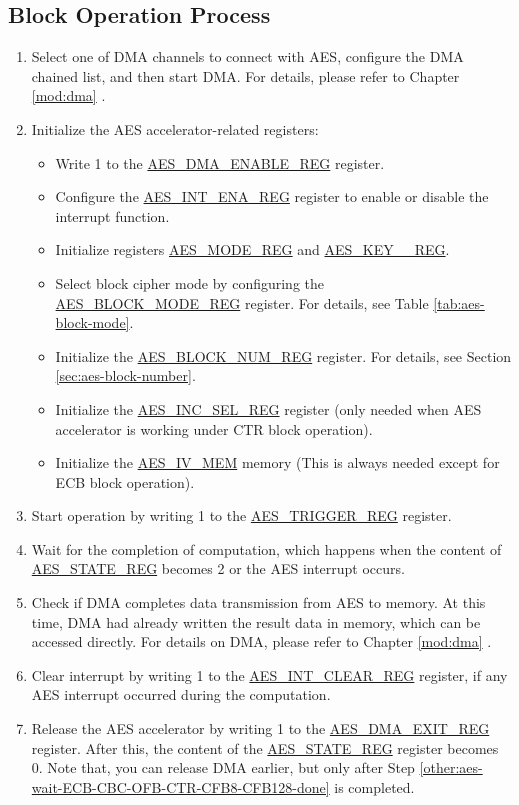 \documentclass[main\_\_EN.tex]{subfiles}
\begin{document}
\subsection{Block Operation Process}
\begin{enumerate}
    \item Select one of DMA channels to connect with AES, configure the DMA chained list, and then start DMA. For details, please refer to Chapter \ref{mod:dma} \textit{}.
    \item Initialize the AES accelerator-related registers:
    \begin{itemize}
        \item Write 1 to the \hyperref[regdesc:AESDMAENABLEREG]{AES\_DMA\_ENABLE\_REG} register.
        \item Configure the \hyperref[regdesc:AESINTENAREG]{AES\_INT\_ENA\_REG} register to enable or disable the interrupt function.
        \item Initialize registers \hyperref[regdesc:AESMODEREG]{AES\_MODE\_REG} and \hyperref[regdesc:AESKEYnREG]{AES\_KEY\_\_REG}.
        \item Select block cipher mode by configuring the \hyperref[regdesc:AESBLOCKMODEREG]{AES\_BLOCK\_MODE\_REG} register. For details, see Table \ref{tab:aes-block-mode}.
        \item Initialize the \hyperref[regdesc:AESBLOCKNUMREG]{AES\_BLOCK\_NUM\_REG} register. For details, see Section \ref{sec:aes-block-number}.
        \item Initialize the \hyperref[regdesc:AESINCSELREG]{AES\_INC\_SEL\_REG} register (only needed when AES accelerator is working under CTR block operation).
        \item Initialize the \hyperref[memdesc:AESIVMEM]{AES\_IV\_MEM} memory (This is always needed except for ECB block operation).
    \end{itemize}
    \item Start operation by writing 1 to the \hyperref[regdesc:AESTRIGGERREG]{AES\_TRIGGER\_REG} register.
    \item \label{other:aes-wait-ECB-CBC-OFB-CTR-CFB8-CFB128-done}
            Wait for the completion of computation, which happens when the content of \hyperref[regdesc:AESSTATEREG]{AES\_STATE\_REG} becomes 2 or the AES interrupt occurs.
    \item Check if DMA completes data transmission from AES to memory. At this time, DMA had already written the result data in memory, which can be accessed directly. For details on DMA, please refer to Chapter \ref{mod:dma} \textit{}.
    \item Clear interrupt by writing 1 to the \hyperref[regdesc:AESINTCLEARREG]{AES\_INT\_CLEAR\_REG} register, if any AES interrupt occurred during the computation.
    \item Release the AES accelerator by writing 1 to the \hyperref[regdesc:AESDMAEXITREG]{AES\_DMA\_EXIT\_REG} register. After this, the content of the \hyperref[regdesc:AESSTATEREG]{AES\_STATE\_REG} register becomes 0.
    Note that, you can release DMA earlier, but only after Step \ref{other:aes-wait-ECB-CBC-OFB-CTR-CFB8-CFB128-done} is completed.
\end{enumerate}
\end{document}
